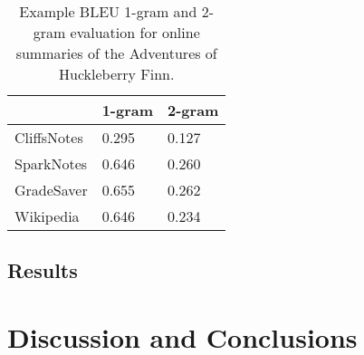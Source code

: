 \begin{table}[H]
	\centering
	\caption{Example BLEU 1-gram and 2-gram evaluation for online summaries of the Adventures of Huckleberry Finn.}\label{table:bleu_huckfinn}
	\begin{tabular}{l l l }
		\toprule
		\textbf{}   & \textbf{1-gram} & \textbf{2-gram} \\ \midrule
		CliffsNotes & 0.295           & 0.127           \\ \midrule
		SparkNotes  & 0.646           & 0.260           \\ \midrule
		GradeSaver  & 0.655           & 0.262           \\ \midrule
		Wikipedia   & 0.646           & 0.234           \\
		\bottomrule
	\end{tabular}
\end{table}

\subsection{Results}


\section{Discussion and Conclusions} %


